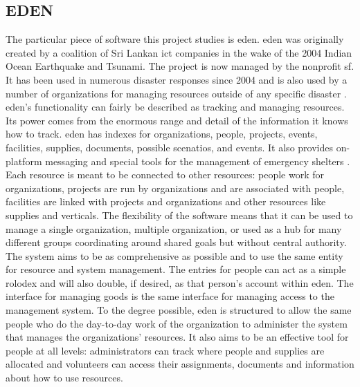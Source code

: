 \documentclass[a4paper,man,natbib]{apa6}
\begin{document}
  \subsection*{EDEN}
   The particular piece of software this project studies is \acrlong{eden}. \acrshort{eden} was originally created by a coalition of Sri Lankan \acrlong{ict} companies in the wake of the 2004 Indian Ocean Earthquake and Tsunami. The project is now managed by the nonprofit \gls{sf}. It has been used in numerous disaster responses since 2004 and is also used by a number of organizations for managing resources outside of any specific disaster \citep{Sahana_Foundation_undated-hl}. \acrshort{eden}'s functionality can fairly be described as tracking and managing resources. Its power comes from the enormous range and detail of the information it knows how to track. \acrshort{eden} has indexes for organizations, people, projects, events, facilities, supplies, documents, possible scenatios, and events. It also provides on-platform messaging and special tools for the management of emergency shelters \citep{Sahana_Foundation2011-od}. Each resource is meant to be connected to other resources: people work for organizations, projects are run by organizations and are associated with people, facilities are linked with projects and organizations and other resources like supplies and verticals. The flexibility of the software means that it can be used to manage a single organization, multiple organization, or used as a hub for many different groups coordinating around shared goals but without central authority. The system aims to be as comprehensive as possible and to use the same entity for resource and system management. The entries for people can act as a simple rolodex and will also double, if desired, as that person's account within \acrshort{eden}. The interface for managing goods is the same interface for managing access to the management system. To the degree possible, \acrshort{eden} is structured to allow the same people who do the day-to-day work of the organization to administer the system that manages the organizations' resources. It also aims to be an effective tool for people at all levels: administrators can track where people and supplies are allocated and volunteers can access their assignments, documents and information about how to use resources.
\end{document}
